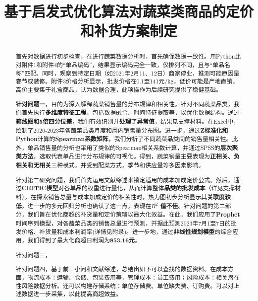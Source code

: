 \documentclass[withoutpreface,bwprint]{cumcmthesis} %
\title{基于启发式优化算法对蔬菜类商品的定价和补货方案制定}
\begin{document}
\maketitle
\begin{abstract}


首先对数据进行初步检查，在进行蔬菜数据分析时，首先确保数据一致性。用Python比对附件1和附件4的“单品编码”，结果显示编码完全一致，仅排列不同，且与“单品名称”匹配。同时，观察到特定日期（如2021年2月11、12日）商家停业，推测可能原因是春节或装修。附件3价格分析显示，批发价格在0.1至141元/kg，低价可能是产地直销，高价主要集于礼盒商品，认为数据合理，此项操作为后续研究提供了稳健基础。

\textbf{针对问题一}，目的为深入解释蔬菜销售量的分布规律和相关性。针对不同蔬菜品类，我们首先执行\textbf{多维度特征工程}，包括数据融合、时间特征提取等，以优化数据结构。通过\textbf{箱线图和5倍四分位差}，我们有效识别并\textbf{处理了异常值}，结果见支撑材料。在Excel中，绘制了2020-2023年各蔬菜品类月度和周内销售量分布图。进一步，通过\textbf{Z标准化和Python}计算的\textbf{Spearman系数矩阵}，我们分析了不同蔬菜品类间的销售量相关性。此外，单品销售量的分析也采用了类似的Spearman相关系数计算，并通过SPSS的\textbf{层次聚类方法}，选取代表单品进行分布规律的可视化。得到，蔬菜销量主要表现为\textbf{正相关、负相关和无相关}三种模式，并受到配菜方式，季节和供应量等多因素影响。

针对第二研究问题，我们首先运用文献综述来锁定适用的成本加成定价公式。然后，通过\textbf{CRITIC模型}对各单品的权重进行量化，从而计算整体\textbf{品类的批发成本}（详见支撑材料）。在探索销售总量与成本加成定价的相关性时，热力图初步分析显示其\textbf{关联度较低}。进一步的多元回归分析也确认了这一点，表现在\textbf{$R^2$ 值不佳}。针对问题的第二部分，我们旨在优化商超的补货量和定价策略以最大化效益。在此，我们应用了\textbf{Prophet}时间序列模型，对各蔬菜品类的销售总量进行预测，并据此预测2023年7月1至7日的批发价格、补货量和成本利润率(详情见附录)。进一步地，通过\textbf{非线性规划模型}的综合应用，我们得到了最大化商超日利润为\textbf{853.16元}。

针对问题三，

针对问题四，基于前三小问和文献综述，总结出如下可以查找的数据资料。在成本方面，物流成本：运输、仓储、包装费用等，管理成本：员工费用；风险成本：相关潜在性风险数据分析。还可以构建存储系统：单位存储费、单位缺失费、订购费。可以对上述数据进一步采集，以此提高商超效益。




\end{abstract}
\end{document}

